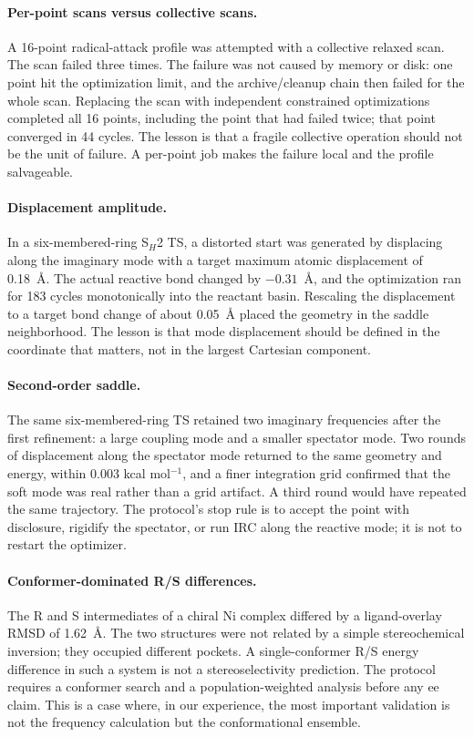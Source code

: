 \documentclass[11pt,a4paper]{article}
\begin{document}
\paragraph{Per-point scans versus collective scans.}
A 16-point radical-attack profile was attempted with a collective relaxed scan. The scan failed three times. The failure was not caused by memory or disk: one point hit the optimization limit, and the archive/cleanup chain then failed for the whole scan. Replacing the scan with independent constrained optimizations completed all 16 points, including the point that had failed twice; that point converged in 44 cycles. The lesson is that a fragile collective operation should not be the unit of failure. A per-point job makes the failure local and the profile salvageable.

\paragraph{Displacement amplitude.}
In a six-membered-ring S$_H$2 TS, a distorted start was generated by displacing along the imaginary mode with a target maximum atomic displacement of 0.18~\AA{}. The actual reactive bond changed by $-0.31$~\AA{}, and the optimization ran for 183 cycles monotonically into the reactant basin. Rescaling the displacement to a target bond change of about 0.05~\AA{} placed the geometry in the saddle neighborhood. The lesson is that mode displacement should be defined in the coordinate that matters, not in the largest Cartesian component.

\paragraph{Second-order saddle.}
The same six-membered-ring TS retained two imaginary frequencies after the first refinement: a large coupling mode and a smaller spectator mode. Two rounds of displacement along the spectator mode returned to the same geometry and energy, within 0.003 kcal mol$^{-1}$, and a finer integration grid confirmed that the soft mode was real rather than a grid artifact. A third round would have repeated the same trajectory. The protocol's stop rule is to accept the point with disclosure, rigidify the spectator, or run IRC along the reactive mode; it is not to restart the optimizer.

\paragraph{Conformer-dominated R/S differences.}
The R and S intermediates of a chiral Ni complex differed by a ligand-overlay RMSD of 1.62~\AA{}. The two structures were not related by a simple stereochemical inversion; they occupied different pockets. A single-conformer R/S energy difference in such a system is not a stereoselectivity prediction. The protocol requires a conformer search and a population-weighted analysis before any ee claim. This is a case where, in our experience, the most important validation is not the frequency calculation but the conformational ensemble.
\end{document}
